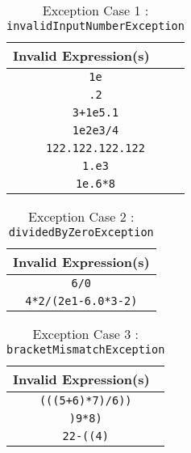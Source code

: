 \documentclass[UTF8]{ctexart}
\begin{document}
\begin{table}[!ht]
    \centering
    \begin{tabular}{|c|}
    \hline
    \multicolumn{1}{|l|}{\textbf{Invalid Expression(s)}} \\ \hline
    \texttt{1e}                             \\ \hline
    \texttt{.2}                             \\ \hline
    \texttt{3+1e5.1}                                     \\ \hline
    \texttt{1e2e3/4}                                     \\ \hline
    \texttt{122.122.122.122}                             \\ \hline
    \texttt{1.e3}                                        \\ \hline
    \texttt{1e.6*8}                                      \\ \hline
    \end{tabular}
    \caption{Exception Case 1 : \texttt{invalidInputNumberException}}
\end{table}
\begin{table}[!ht]
    \centering
    \begin{tabular}{|c|}
    \hline
    \multicolumn{1}{|l|}{Invalid Expression(s)} \\ \hline
    \texttt{6/0}                                     \\ \hline
    \texttt{4*2/(2e1-6.0*3-2)}                       \\ \hline
    \end{tabular}
    \caption{Exception Case 2 : \texttt{dividedByZeroException}}
\end{table}

\begin{table}[!ht]
    \centering
    \begin{tabular}{|c|}
    \hline
    \multicolumn{1}{|l|}{Invalid Expression(s)} \\ \hline
    \texttt{(((5+6)*7)/6))}                              \\ \hline
    \texttt{)9*8)}                                       \\ \hline
    \texttt{22-((4)}                                     \\ \hline
    \end{tabular}
    \caption{Exception Case 3 : \texttt{bracketMismatchException}}
\end{table}
\end{document}
